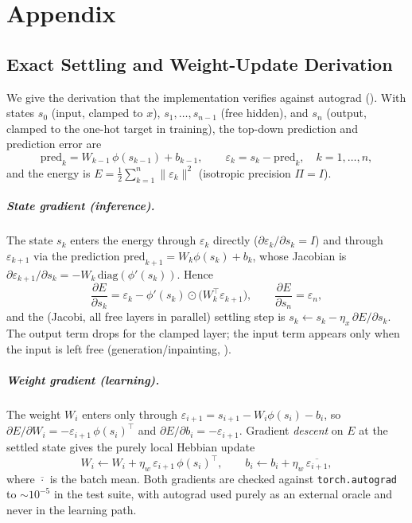 \chapter{Appendix}\label{ch:appendix}

\section{Exact Settling and Weight-Update Derivation}\label{app:derivation}

We give the derivation that the implementation verifies against autograd (). With
states $s_0$ (input, clamped to $x$), $s_1,\dots,s_{n-1}$ (free hidden), and $s_n$ (output, clamped
to the one-hot target in training), the top-down prediction and prediction error are
\[
\mathrm{pred}_{k} = W_{k-1}\,\phi(s_{k-1}) + b_{k-1},
\qquad
\varepsilon_k = s_k - \mathrm{pred}_k,\quad k=1,\dots,n,
\]
and the energy is $E = \tfrac12\sum_{k=1}^{n}\lVert\varepsilon_k\rVert^2$ (isotropic precision
$\Pi=I$).

\paragraph{State gradient (inference).} The state $s_k$ enters the energy through $\varepsilon_k$
directly ($\partial\varepsilon_k/\partial s_k = I$) and through $\varepsilon_{k+1}$ via the
prediction $\mathrm{pred}_{k+1}=W_k\phi(s_k)+b_k$, whose Jacobian is
$\partial\varepsilon_{k+1}/\partial s_k = -W_k\,\mathrm{diag}(\phi'(s_k))$. Hence
\[
\frac{\partial E}{\partial s_k}
= \varepsilon_k - \phi'(s_k)\odot\big(W_k^{\top}\varepsilon_{k+1}\big),
\qquad
\frac{\partial E}{\partial s_n}=\varepsilon_n,
\]
and the (Jacobi, all free layers in parallel) settling step is
$s_k \leftarrow s_k - \eta_x\,\partial E/\partial s_k$. The output term drops for the clamped layer;
the input term appears only when the input is left free (generation/inpainting, ).

\paragraph{Weight gradient (learning).} The weight $W_i$ enters only through
$\varepsilon_{i+1}=s_{i+1}-W_i\phi(s_i)-b_i$, so
$\partial E/\partial W_i = -\varepsilon_{i+1}\,\phi(s_i)^{\top}$ and
$\partial E/\partial b_i = -\varepsilon_{i+1}$. Gradient \emph{descent} on $E$ at the settled state
gives the purely local Hebbian update
\[
W_i \leftarrow W_i + \eta_w\,\varepsilon_{i+1}\,\phi(s_i)^{\top},
\qquad
b_i \leftarrow b_i + \eta_w\,\overline{\varepsilon_{i+1}},
\]
where $\overline{\cdot}$ is the batch mean. Both gradients are checked against
\texttt{torch.autograd} to $\sim\!10^{-5}$ in the test suite, with autograd used purely as an
external oracle and never in the learning path.

